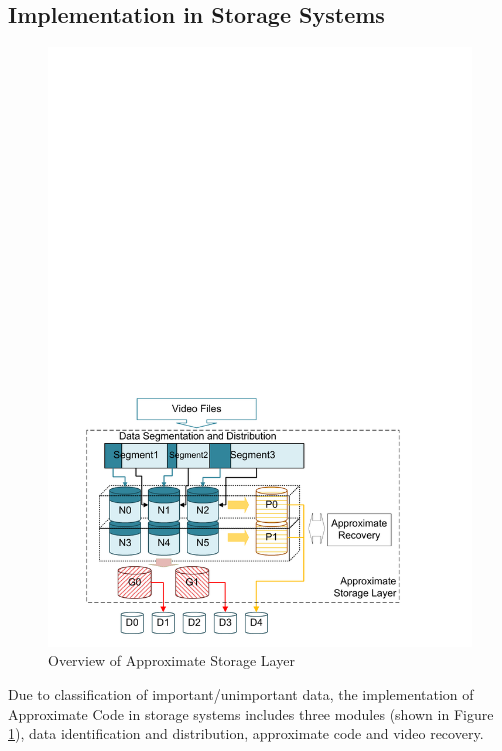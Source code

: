 \documentclass[sigconf]{acmart}
\begin{document}
\subsection{Implementation in Storage Systems}\label{Implementation}
\begin{figure}[htb]
\centering
\includegraphics[width=0.85\linewidth]{photo/implementation-V2.pdf}
\vspace{-3mm}
\caption{Overview of Approximate Storage Layer}
\vspace{-3mm}
\label{fig-implementation}
\end{figure}

Due to classification of important/unimportant data, the implementation of Approximate Code in storage systems includes three modules (shown in Figure \ref{fig-implementation}), data identification and distribution, approximate code and video recovery.
\end{document}
